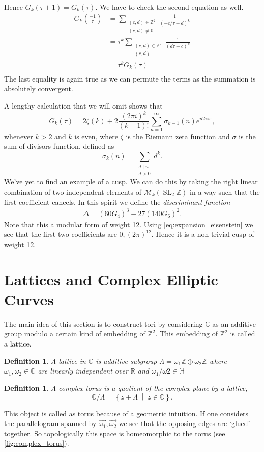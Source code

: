 \documentclass[a4paper]{article}
\theoremstyle{theoremdd}
\theoremstyle{definitiondd}
\newtheorem{definition}[theorem]{Definition}
\theoremstyle{remarkdd}
\newcommand{\Z}{\mathbb{Z}}
\newcommand{\C}{\mathbb{C}}
\newcommand{\R}{\mathbb{R}}
\newcommand{\bigset}[2]{ \left\{ #1 \;\middle|\; #2 \right\} }
\DeclareMathOperator{\SL}{SL}
\begin{document}
Hence $G_k(\tau + 1) = G_k(\tau)$.
We have to check the second equation as well.
\begin{align*}
	G_k\left(\frac{-1}{\tau}\right) &=  \sum_{\substack{(c,d) \in \Z^2 \\ (c,d) \ne 0}} \frac{1}{(-c / \tau + d)^{k}}\\
			     &= \tau^{k} \sum_{\substack{(c, d) \in \Z^2 \\ (c,d)}} \frac{1}{(d \tau - c)^{k}} \\
			     &= \tau^{k}G_k(\tau) \\
\end{align*}
The last equality is again true as we can permute the terms as the summation is absolutely convergent.

A lengthy calculation that we will omit shows that \begin{equation}\label{eq:expansion_eisenstein}
	G_k(\tau) = 2 \zeta(k) + 2 \frac{(2\pi i)^{k}}{(k-1)!}\sum_{n = 1}^{\infty} \sigma_{k-1}(n)  e^{n 2 \pi i \tau}
,\end{equation}
whenever $ k>2$ and $k$ is even, where $\zeta$ is the Riemann zeta function and $\sigma$ is the sum of divisors function, defined as
\[
	\sigma_{k}(n) = \sum_{\substack{d \mathbin | n \\ d > 0}} d^{k}
.\] 
We've yet to find an example of a cusp. We can do this by taking the right linear combination of two independent elements of $\mathcal{M} _k(\SL_2\Z)$ in a way such that the first coefficient cancels.
In this spirit we define the \emph{discriminant function}
\begin{align*}
	\Delta = (60 G_4)^3 - 27(140G_6)^2
.\end{align*}
Note that this a modular form of weight 12. 
Using \cref{eq:expansion_eisenstein} we see that the first two coefficients are $0, (2 \pi)^{12}$. 
Hence it is a non-trivial cusp of weight 12. 

\section{Lattices and Complex Elliptic Curves}
The main idea of this section is to construct tori by considering $\C$ as an additive group modulo a certain kind of embedding of $\Z^2$. This embedding of $\Z^2$ is called a lattice.  
\begin{definition}
	A \emph{lattice in $\C$} is additive subgroup $\Lambda = \omega_1 \Z \oplus \omega_2 \Z$ where $\omega_1, \omega_2 \in \C$ are linearly independent over $\R$ and $\omega_1 / \omega 2  \in \mathbb{H}$
\end{definition}
\begin{definition}
	A \emph{complex torus} is a quotient of the complex plane by a lattice, \[
		\C / \Lambda = \bigset{z + \Lambda}{z \in \C} 
	.\] 
\end{definition}
This object is called as torus because of a geometric intuition. 
If one considers the parallelogram spanned by $\vec{\omega_1}, \vec{\omega_2}$ we see that the opposing edges are `glued' together. 
So topologically this space is homeomorphic to the torus (see \cref{fig:complex_torus}). 
\end{document}
